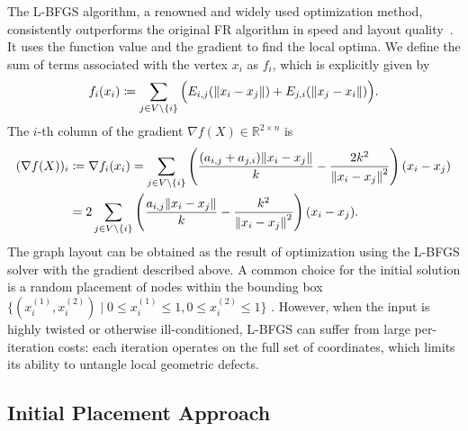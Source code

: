\documentclass[11pt]{article}
\newcommand{\defeq}{\coloneqq}
\begin{document}
The L-BFGS algorithm, a renowned and widely used optimization
method, consistently outperforms the original FR algorithm in speed
and layout quality~\citep{6183577}. It uses the function value and the gradient to find the local optima. We define the sum of terms associated with the vertex $x_{i}$ as $f_{i}$, which is explicitly given by
\begin{equation*}
  f_{i}(x_{i}) \coloneqq \sum_{j \in V \setminus \{i\}}\Big( E_{i,j}(\norm{x_{i}- x_{j}}) + E_{j,i}(\norm{x_{j}- x_{i}}) \Big).
\end{equation*}
The $i$-th column of the gradient $\nabla f(X) \in \mathbb{R}^{2 \times n}$ is
\begin{align*}
  (\nabla f(X))_{i} & \defeq \nabla f_{i}(x_{i}) = \sum_{j \in V \setminus \{i\}}\left(\frac{(a_{i,j}+a_{j,i})\norm{ x_{i}- x_{j}}}{k}- \frac{2k^{2}}{\norm{ x_{i}- x_{j}}^{2}}\right) (x_{i}- x_{j}) \\
                    & = 2 \sum_{j \in V \setminus \{i\}}\left(\frac{a_{i,j}\norm{ x_{i}- x_{j}}}{k}- \frac{k^{2}}{\norm{ x_{i}- x_{j}}^{2}}\right) (x_{i}- x_{j}).
\end{align*}
The graph layout can be obtained as the result of optimization using the L-BFGS solver with the gradient described above. A common choice for the initial solution is a random placement of nodes within the bounding box
$\{(x_{i}^{(1)},x_{i}^{(2)}) \mathrel\mid 0 \leq x_{i}^{(1)}\leq 1, 0 \leq x_{i}
    ^{(2)}\leq 1\}$ \citep{2020SciPy-NMeth}.
However, when the input is highly twisted or otherwise ill-conditioned,
L-BFGS can suffer from large per-iteration costs: each iteration operates on the full set of coordinates, which limits its ability to untangle local geometric defects.

\subsection{Initial Placement Approach}
\label{ssec:preprocessing}
\end{document}
